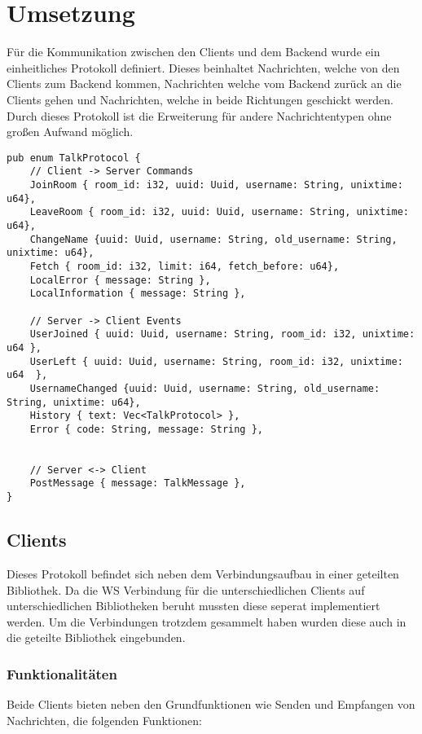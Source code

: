 
\chapter{Umsetzung}
Für die Kommunikation zwischen den Clients und dem Backend wurde ein einheitliches Protokoll definiert. Dieses beinhaltet Nachrichten, welche von den Clients zum Backend kommen, Nachrichten welche vom Backend zurück an die Clients gehen und Nachrichten, welche in beide Richtungen geschickt werden. Durch dieses Protokoll ist die Erweiterung für andere Nachrichtentypen ohne großen Aufwand möglich.

\begin{lstlisting}[caption=Kommunikationsprotokoll, label=Kommunikationsprotokoll, basicstyle=\ttfamily\scriptsize]
pub enum TalkProtocol {
    // Client -> Server Commands
    JoinRoom { room_id: i32, uuid: Uuid, username: String, unixtime: u64},
    LeaveRoom { room_id: i32, uuid: Uuid, username: String, unixtime: u64},
    ChangeName {uuid: Uuid, username: String, old_username: String, unixtime: u64},
    Fetch { room_id: i32, limit: i64, fetch_before: u64},
    LocalError { message: String },
    LocalInformation { message: String },

    // Server -> Client Events
    UserJoined { uuid: Uuid, username: String, room_id: i32, unixtime: u64 },
    UserLeft { uuid: Uuid, username: String, room_id: i32, unixtime: u64  },
    UsernameChanged {uuid: Uuid, username: String, old_username: String, unixtime: u64},
    History { text: Vec<TalkProtocol> },
    Error { code: String, message: String },


    // Server <-> Client
    PostMessage { message: TalkMessage },
}
\end{lstlisting}

\section{Clients}
Dieses Protokoll befindet sich neben dem Verbindungsaufbau in einer geteilten Bibliothek. Da die \ac{WS} Verbindung für die unterschiedlichen Clients auf unterschiedlichen Bibliotheken beruht mussten diese seperat implementiert werden. Um die Verbindungen trotzdem gesammelt haben wurden diese auch in die geteilte Bibliothek eingebunden.

\subsection{Funktionalitäten}
Beide Clients bieten neben den Grundfunktionen wie Senden und Empfangen von Nachrichten, die folgenden Funktionen:

